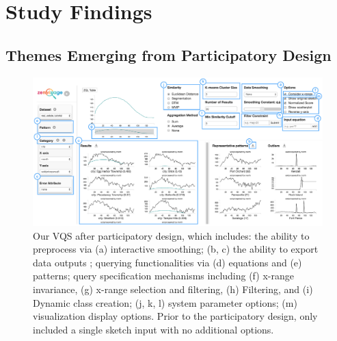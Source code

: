 \section{Study Findings}
\subsection{Themes Emerging from Participatory Design\label{pd_findings}}
\begin{figure}[ht!]
\centering
\vspace{-15pt}
\includegraphics[width=\linewidth]{figures/newZV.pdf} %
\vspace{-5pt}\caption{Our VQS after participatory design, which includes: the ability to preprocess via (a) interactive smoothing; (b, c) the ability to export data outputs ; querying functionalities via (d) equations and (e) patterns; query specification mechanisms including (f) x-range invariance, (g) x-range selection and filtering, (h) Filtering, and (i) Dynamic class creation; (j, k, l) system parameter options; (m) visualization display options. Prior to the participatory design, \zv only included a single sketch input with no additional options.}
\label{zvOverview}
\vspace{-14pt}
\end{figure}

